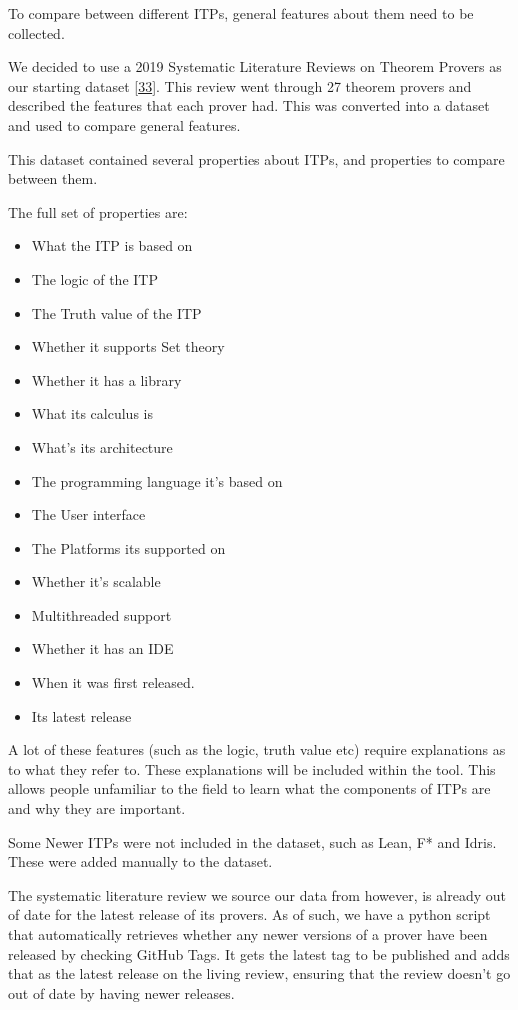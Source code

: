 \documentclass[
]{article}
\providecommand{\tightlist}{%
  \setlength{\itemsep}{0pt}\setlength{\parskip}{0pt}}
\begin{document}
To compare between different ITPs, general features about them need to
be collected.

We decided to use a 2019 Systematic Literature Reviews on Theorem
Provers as our starting dataset
{[}\protect\hyperlink{ref-nawaz_survey_2019}{33}{]}. This review went
through 27 theorem provers and described the features that each prover
had. This was converted into a dataset and used to compare general
features.

This dataset contained several properties about ITPs, and properties to
compare between them.

The full set of properties are:

\begin{itemize}
\tightlist
\item
  What the ITP is based on
\item
  The logic of the ITP
\item
  The Truth value of the ITP
\item
  Whether it supports Set theory
\item
  Whether it has a library
\item
  What its calculus is
\item
  What's its architecture
\item
  The programming language it's based on
\item
  The User interface
\item
  The Platforms its supported on
\item
  Whether it's scalable
\item
  Multithreaded support
\item
  Whether it has an IDE
\item
  When it was first released.
\item
  Its latest release
\end{itemize}

A lot of these features (such as the logic, truth value etc) require
explanations as to what they refer to. These explanations will be
included within the tool. This allows people unfamiliar to the field to
learn what the components of ITPs are and why they are important.

Some Newer ITPs were not included in the dataset, such as Lean, F* and
Idris. These were added manually to the dataset.

The systematic literature review we source our data from however, is
already out of date for the latest release of its provers. As of such,
we have a python script that automatically retrieves whether any newer
versions of a prover have been released by checking GitHub Tags. It gets
the latest tag to be published and adds that as the latest release on
the living review, ensuring that the review doesn't go out of date by
having newer releases.
\end{document}
